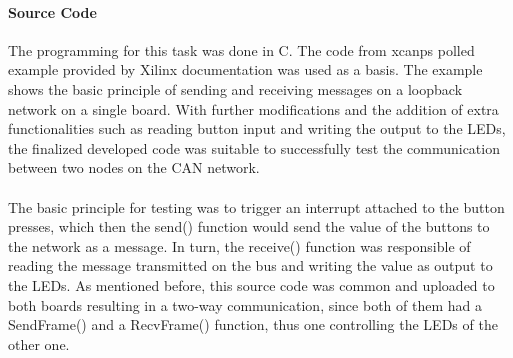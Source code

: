 \paragraph{Source Code}
The programming for this task was done in C.
The code from xcanps polled example provided by Xilinx documentation was used as a basis.
The example shows the basic principle of sending and receiving messages on a loopback network on a single board.
With further modifications and the addition of extra functionalities such as reading button input and writing the output to the LEDs, the finalized developed code was suitable to successfully test the communication between two nodes on the CAN network.
\\\\
The basic principle for testing was to trigger an interrupt attached to the button presses, which then the send() function would send the value of the buttons to the network as a message.
In turn, the receive() function was responsible of reading the message transmitted on the bus and writing the value as output to the LEDs.
As mentioned before, this source code was common and uploaded to both boards resulting in a two-way communication, since both of them had a SendFrame() and a RecvFrame() function, thus one controlling the LEDs of the other one.

